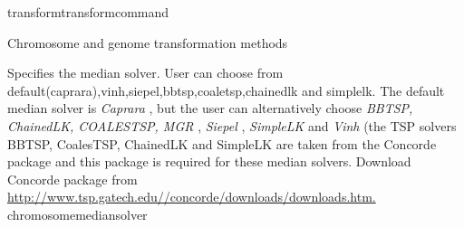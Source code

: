 \begin{command}{transform}{transformcommand}
\begin{arguments}
\begin{argumentgroup}{Chromosome and genome transformation methods}
\begin{description}
{Specifies the median solver. User can choose from
default(caprara),vinh,siepel,bbtsp,coaletsp,chainedlk and simplelk. 
The default median solver is \emph{Caprara} \cite{Caprara2001}, 
but the user can alternatively choose \emph{BBTSP, ChainedLK, 
COALESTSP, MGR} \cite{bourqueandpevzner2002}, 
\emph{Siepel} \cite{siepelmoret2001}, \emph{SimpleLK} 
and \emph{Vinh} (the TSP solvers BBTSP, CoalesTSP, 
ChainedLK and SimpleLK are taken from the Concorde package and this package
is required for these median solvers. Download Concorde package from \\
\url{http://www.tsp.gatech.edu//concorde/downloads/downloads.htm. } }
{chromosomemediansolver}





\end{description}
\end{argumentgroup}
\end{arguments}
\end{command}
